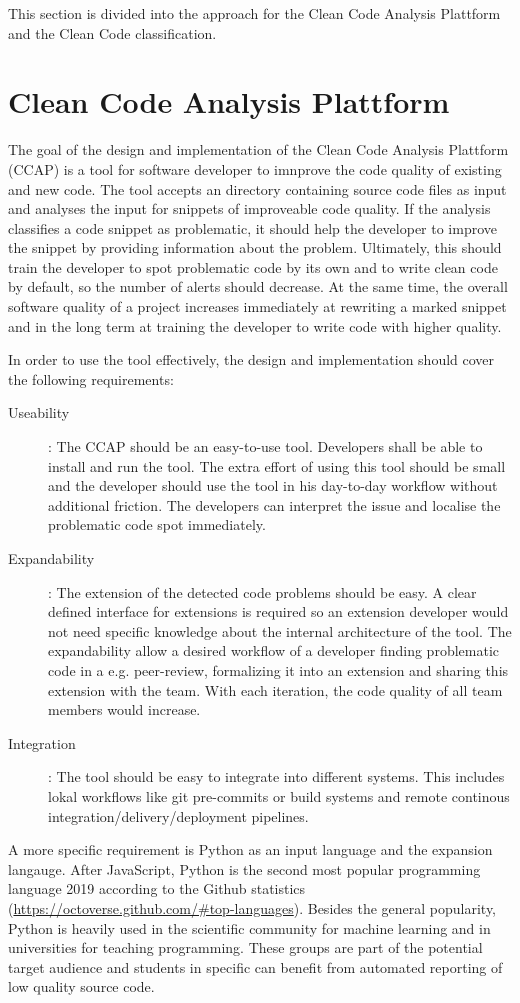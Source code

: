 This section is divided into the approach for the Clean Code Analysis Plattform and the Clean Code classification.

\chapter{Clean Code Analysis Plattform}
The goal of the design and implementation of the Clean Code Analysis Plattform (CCAP) is a tool for software developer to imnprove the code quality of existing and new code. The tool accepts an directory containing source code files as input and analyses the input for snippets of improveable code quality. If the analysis classifies a code snippet as problematic, it should help the developer to improve the snippet by providing information about the problem. Ultimately, this should train the developer to spot problematic code by its own and to write clean code by default, so the number of alerts should decrease. At the same time, the overall software quality of a project increases immediately at rewriting a marked snippet and in the long term at training the developer to write code with higher quality.

In order to use the tool effectively, the design and implementation should cover the following requirements:
\begin{description}
    \item[Useability]:  The CCAP should be an easy-to-use tool. Developers shall be able to install and run the tool. The extra effort of using this tool should be small and the developer should use the tool in his day-to-day workflow without additional friction. The developers can interpret the issue and localise the problematic code spot immediately.
    \item[Expandability]: The extension of the detected code problems should be easy. A clear defined interface for extensions is required so an extension developer would not need specific knowledge about the internal architecture of the tool. The expandability allow a desired workflow of a developer finding problematic code in a e.g. peer-review, formalizing it into an extension and sharing this extension with the team. With each iteration, the code quality of all team members would increase.
    \item[Integration]: The tool should be easy to integrate into different systems. This includes lokal workflows like git pre-commits or build systems and remote continous integration/delivery/deployment pipelines.
\end{description}
A more specific requirement is Python as an input language and the expansion langauge. After JavaScript, Python is the second most popular programming language 2019 according to the Github statistics (\url{https://octoverse.github.com/#top-languages}). Besides the general popularity, Python is heavily used in the scientific community for machine learning and in universities for teaching programming. These groups are part of the potential target audience and students in specific can benefit from automated reporting of low quality source code.

